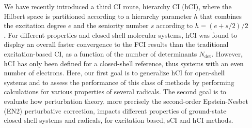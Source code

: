 \documentclass[aip,jcp,reprint,noshowkeys,superscriptaddress]{revtex4-1}
\newcommand{\Ndet}{N_\text{det}}
\begin{document}
We have recently introduced a third CI route, hierarchy CI (hCI), \cite{Kossoski_2022}
where the Hilbert space is partitioned according to a hierarchy parameter $h$ that combines the excitation degree $e$ and the seniority number $s$ according to $h = (e+s/2)/2$.
For different properties and closed-shell molecular systems, 
hCI was found to display an overall faster convergence to the FCI results than the traditional excitation-based CI, as a function of the number of determinants $\Ndet$. \cite{Kossoski_2022}
However, hCI has only been defined for a closed-shell reference, thus systems with an even number of electrons.
Here, our first goal is to generalize hCI for open-shell systems and to assess the performance of this class of methods by performing calculations for various properties of several radicals.
The second goal is to evaluate how perturbation theory, more precisely the second-order Epstein-Nesbet (EN2) perturbative correction, \cite{}
impacts different properties of ground-state closed-shell systems and radicals, for excitation-based, sCI and hCI methods.
\end{document}
